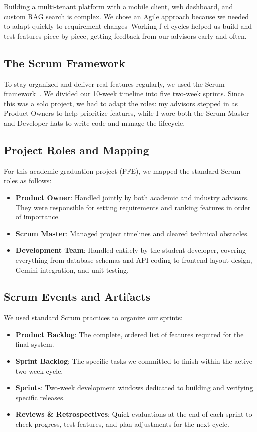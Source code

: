 \documentclass[12pt,a4paper]{report}
\begin{document}
Building a multi-tenant platform with a mobile client, web dashboard, and custom RAG search is complex. We chose an Agile approach because we needed to adapt quickly to requirement changes. Working f el cycles helped us build and test features piece by piece, getting feedback from our advisors early and often.

\subsection{The Scrum Framework}

To stay organized and deliver real features regularly, we used the Scrum framework~\cite{scrumguide}. We divided our 10-week timeline into five two-week sprints. Since this was a solo project, we had to adapt the roles: my advisors stepped in as Product Owners to help prioritize features, while I wore both the Scrum Master and Developer hats to write code and manage the lifecycle.

\subsection{Project Roles and Mapping}

For this academic graduation project (PFE), we mapped the standard Scrum roles as follows:
\begin{itemize}
    \item \textbf{Product Owner}: Handled jointly by both academic and industry advisors. They were responsible for setting requirements and ranking features in order of importance.
    \item \textbf{Scrum Master}: Managed project timelines and cleared technical obstacles.
    \item \textbf{Development Team}: Handled entirely by the student developer, covering everything from database schemas and API coding to frontend layout design, Gemini integration, and unit testing.
\end{itemize}

\subsection{Scrum Events and Artifacts}

We used standard Scrum practices to organize our sprints:
\begin{itemize}
    \item \textbf{Product Backlog}: The complete, ordered list of features required for the final system.
    \item \textbf{Sprint Backlog}: The specific tasks we committed to finish within the active two-week cycle.
    \item \textbf{Sprints}: Two-week development windows dedicated to building and verifying specific releases.
    \item \textbf{Reviews \& Retrospectives}: Quick evaluations at the end of each sprint to check progress, test features, and plan adjustments for the next cycle.
\end{itemize}
\end{document}
